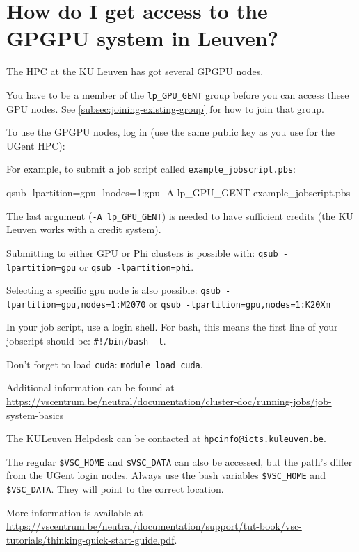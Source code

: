 \ifgent
\section{How do I get access to the GPGPU system in Leuven?}

The HPC at the KU Leuven has got several GPGPU nodes.

You have to be a member of the \lstinline|lp_GPU_GENT| group before you can
access these GPU nodes. See \autoref{subsec:joining-existing-group} for how to join that group.

To use the GPGPU nodes, log in (use the same public key as you use for the UGent HPC):

\begin{prompt}
\end{prompt}

For example, to submit a job script called \lstinline|example_jobscript.pbs|:

\begin{prompt}
qsub -lpartition=gpu -lnodes=1:gpu -A lp_GPU_GENT example_jobscript.pbs
\end{prompt}

The last argument (\lstinline|-A lp_GPU_GENT|) is needed to have sufficient credits
(the KU Leuven works with a credit system).

Submitting to either GPU or Phi clusters is possible with: \lstinline|qsub -lpartition=gpu|
or \lstinline|qsub -lpartition=phi|.

Selecting a specific gpu node is also possible:
\lstinline|qsub -lpartition=gpu,nodes=1:M2070| or \lstinline|qsub -lpartition=gpu,nodes=1:K20Xm|

In your job script, use a login shell. For bash, this means the first line of your jobscript should be:
\lstinline|#!/bin/bash -l|.

Don't forget to load \lstinline|cuda|: \lstinline|module load cuda|.

Additional information can be found at \url{https://vscentrum.be/neutral/documentation/cluster-doc/running-jobs/job-system-basics}

The KULeuven Helpdesk can be contacted at \lstinline|hpcinfo@icts.kuleuven.be|.

The regular \lstinline|$VSC_HOME| and \lstinline|$VSC_DATA| can also be accessed,
but the path's differ from the UGent login nodes. Always use the bash variables \lstinline|$VSC_HOME|
and \lstinline|$VSC_DATA|. They will point to the correct location.

More information is available at \url{https://vscentrum.be/neutral/documentation/support/tut-book/vsc-tutorials/thinking-quick-start-guide.pdf}.
\fi

